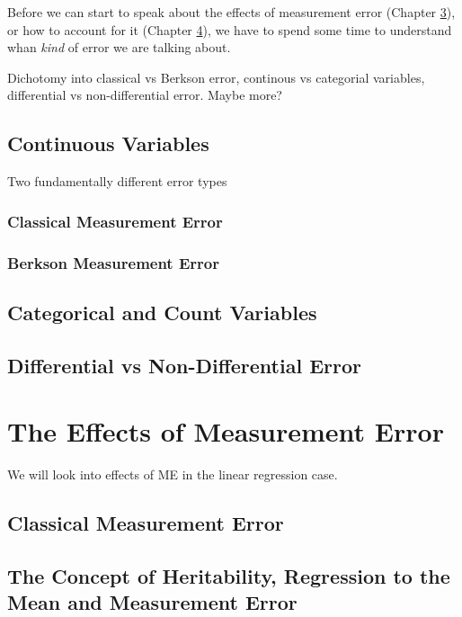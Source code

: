 \documentclass[]{book}
\theoremstyle{definition}
\theoremstyle{definition}
\theoremstyle{definition}
\theoremstyle{remark}
\begin{document}
Before we can start to speak about the effects of measurement error
(Chapter \protect\hyperlink{effects}{3}), or how to account for it
(Chapter \protect\hyperlink{accounting}{4}), we have to spend some time
to understand whan \emph{kind} of error we are talking about.

Dichotomy into classical vs Berkson error, continous vs categorial
variables, differential vs non-differential error. Maybe more?

\section{Continuous Variables}\label{sec:errortypes}

Two fundamentally different error types

\subsection{Classical Measurement Error}\label{sec:errortypescl}

\subsection{Berkson Measurement Error}\label{sec:errortypesB}

\section{Categorical and Count
Variables}\label{categorical-and-count-variables}

\section{Differential vs Non-Differential
Error}\label{differential-vs-non-differential-error}

\hypertarget{effects}{\chapter{The Effects of Measurement
Error}\label{effects}}

We will look into effects of ME in the linear regression case.

\section{Classical Measurement Error}\label{sec:clErrorEffect}

\section{The Concept of Heritability, Regression to the Mean and
Measurement Error}\label{sec:heritability}
\end{document}
